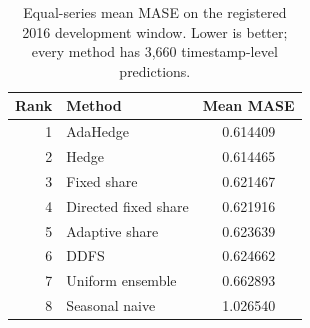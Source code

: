\begin{table}[H]
\centering
\caption{Equal-series mean MASE on the registered 2016 development window. Lower is better; every method has 3,660 timestamp-level predictions.}
\label{tab:results}
\begin{tabular}{r l S[table-format=1.6]}
\toprule
Rank & Method & {Mean MASE} \\
 & AdaHedge & 0.614409 \\
2 & Hedge & 0.614465 \\
3 & Fixed share & 0.621467 \\
4 & Directed fixed share & 0.621916 \\
5 & Adaptive share & 0.623639 \\
6 & \textsc{DDFS} & 0.624662 \\
7 & Uniform ensemble & 0.662893 \\
8 & Seasonal naive & 1.026540 \\
\bottomrule
\end{tabular}
\end{table}
